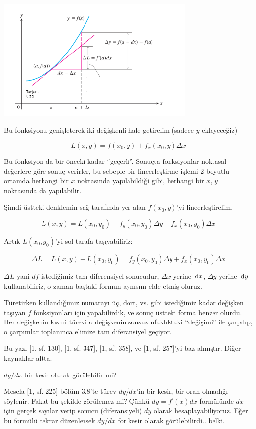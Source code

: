 \documentclass[12pt,fleqn]{article}\usepackage{../../common}
\begin{document}
\includegraphics[height=6cm]{ode_mattuck_95_total_06.png}

Bu fonksiyonu genişleterek iki değişkenli hale getirelim (sadece $y$
ekleyeceğiz)

$$ L(x,y) = f(x_0,y) + f_x(x_0,y) \Delta x $$

Bu fonksiyon da bir önceki kadar ``geçerli''. Sonuçta fonksiyonlar
noktasal değerlere göre sonuç verirler, bu sebeple bir lineerleştirme
işlemi 2 boyutlu ortamda herhangi bir $x$ noktasında yapılabildiği
gibi, herhangi bir $x$, $y$ noktasında da yapılabilir.

Şimdi üstteki denklemin sağ tarafında yer alan $f(x_0,y)$'yi lineerleştirelim.  

$$ L(x,y) = L(x_0,y_0) + f_y(x_0,y_0) \Delta y + f_x(x_0,y_0) \Delta x $$

Artık $L(x_0,y_0)$'yi sol tarafa taşıyabiliriz:

$$ \Delta L = L(x,y) - L(x_0,y_0) = f_y(x_0,y_0) \Delta y + f_x(x_0,y_0)
\Delta x $$ 

$\Delta L$ yani $df$ istediğimiz tam diferensiyel sonucudur, $\Delta
x$ yerine $\,\mathrm{d} x$, $\Delta y$ yerine $\,\mathrm{d} y$ kullanabiliriz, o zaman baştaki
formun aynısını elde etmiş oluruz.

Türetirken kullandığımız numarayı üç, dört, vs. gibi istediğimiz kadar
değişken taşıyan $f$ fonksiyonları için yapabilirdik, ve sonuç üstteki
forma benzer olurdu. Her değişkenin kısmi türevi o değişkenin sonsuz
ufaklıktaki ``değişimi'' ile çarpılıp, o çarpımlar toplanınca elimize
tam diferansiyel geçiyor.

Bu yazı [1, sf. 130], [1, sf. 347], [1, sf. 358], ve [1, sf. 257]'yi baz
almıştır. Diğer kaynaklar altta. 

$dy/dx$ bir kesir olarak görülebilir mi? 

Mesela [1, sf. 225] bölüm 3.8'te türev $dy/dx$'in bir kesir, bir oran
olmadığı söylenir. Fakat bu şekilde görülemez mi? Çünkü $dy = f'(x)dx$
formülünde $dx$ için gerçek sayılar verip sonucu (diferansiyeli) $dy$
olarak hesaplayabiliyoruz. Eğer bu formülü tekrar düzenlersek $dy/dx$ for
kesir olarak görülebilirdi.. belki.
\end{document}
